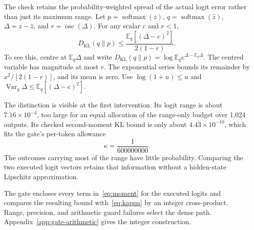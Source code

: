 \documentclass[10pt]{article}
\theoremstyle{definition}\newtheorem{definition}[theorem]{Definition}
\newcommand{\KL}{D_{\mathrm{KL}}}
\newcommand{\osc}{\operatorname{osc}}
\newcommand{\E}{\mathbb E}
\begin{document}
The check retains the probability-weighted spread of the actual logit error rather than just its maximum range. Let $p=\operatorname{softmax}(z)$, $q=\operatorname{softmax}(\hat z)$, $\Delta=z-\hat z$, and $r=\osc(\Delta)$. For any scalar $c$ and $r<1$,
\begin{equation}\label{eq:moment}
 \KL(q\|p)\leq
 \frac{\E_q[(\Delta-c)^2]}{2(1-r)}.
\end{equation}
To see this, centre at $\E_q\Delta$ and write
$\KL(q\|p)=\log\E_q e^{\Delta-\E_q\Delta}$. The centred variable has magnitude at most $r$. The exponential series bounds its remainder by $x^2/[2(1-r)]$, and its mean is zero. Use $\log(1+u)\leq u$ and
$\operatorname{Var}_q\Delta\leq\E_q[(\Delta-c)^2]$. 

The distinction is visible at the first intervention. Its logit range is about $7.16\times10^{-4}$, too large for an equal allocation of the range-only budget over 1,024 outputs. Its checked second-moment KL bound is only about $4.43\times10^{-10}$, which fits the gate's per-token allowance
\begin{equation}\label{eq:kappa}
                       \kappa=\frac1{600000000}.
\end{equation}
The outcomes carrying most of the range have little probability. Comparing the two executed logit vectors retains that information without a hidden-state Lipschitz approximation.

The gate encloses every term in~\eqref{eq:moment} for the executed logits and compares the resulting bound with~\eqref{eq:kappa} by an integer cross-product. Range, precision, and arithmetic guard failures select the dense path. Appendix~\ref{app:gate-arithmetic} gives the integer construction.
\end{document}
